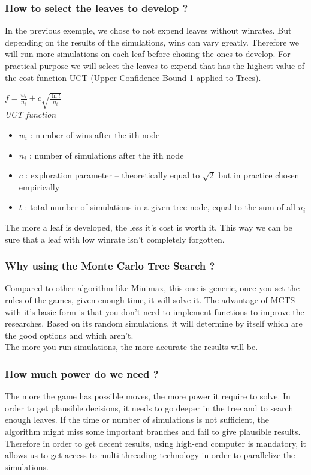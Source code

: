 \subsubsection{How to select the leaves to develop ?}
In the previous exemple, we chose to not expend leaves without winrates. But depending on the results of the simulations, wins can vary greatly. Therefore we will run more simulations on each leaf before chosing the ones to develop. For practical purpose we will select the leaves to expend that has the highest value of the cost function UCT (Upper Confidence Bound 1 applied to Trees).\\
\bigskip
\begin{minipage}[b]{1\linewidth}
\centering
\ensuremath{f = \frac{w_i}{n_i} + c\sqrt{\frac{\ln t}{n_i}}}\\
\medskip
\tiny{\textit{UCT function}}
\end{minipage}%
\bigskip
\begin{itemize}
  \item \ensuremath{w_i} : number of wins after the ith node
  \item \ensuremath{n_i} : number of simulations after the ith node
  \item \ensuremath{c}   : exploration parameter – theoretically equal to \ensuremath{\sqrt{2}} but in practice chosen empirically
  \item \ensuremath{t}   : total number of simulations in a given tree node, equal to the sum of all \ensuremath{n_i}
\end{itemize}
\medskip
The more a leaf is developed, the less it's cost is worth it. This way we can be sure that a leaf with low winrate isn't completely forgotten.\\

\subsubsection{Why using the Monte Carlo Tree Search ?}
Compared to other algorithm like Minimax, this one is generic, once you set the rules of the games, given enough time, it will solve it. The advantage of MCTS with it's basic form is that you don't need to implement functions to improve the researches. Based on its random simulations, it will determine by itself which are the good options and which aren't.\\ The more you run simulations, the more accurate the results will be.

\subsubsection{How much power do we need ?}
The more the game has possible moves, the more power it require to solve. In order to get plausible decisions, it needs to go deeper in the tree and to search enough leaves. If the time or number of simulations is not sufficient, the algorithm might miss some important branches and fail to give plausible results. Therefore in order to get decent results, using high-end computer is mandatory, it allows us to get access to multi-threading technology in order to parallelize the simulations.